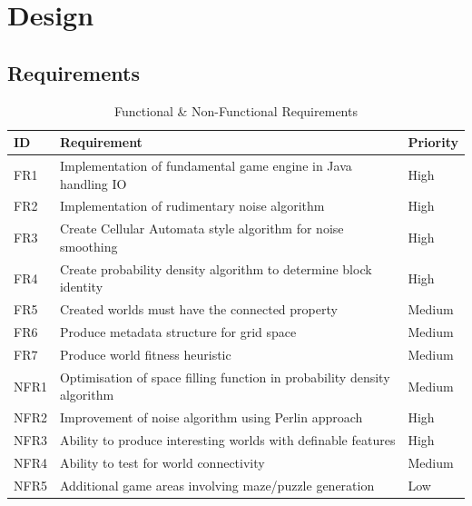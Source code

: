 \documentclass[12pt,a4paper]{article}
\begin{document}
\section{Design}

\subsection{Requirements}

\begin{table}[h!]
\centering
\begin{tabular}{l|l|l}
\textbf{ID}  & \textbf{Requirement}                                           & \textbf{Priority} \\ \hline
FR1 & Implementation of fundamental game engine in Java handling IO    & High     \\
FR2 & Implementation of rudimentary noise algorithm                         & High     \\
FR3 & Create Cellular Automata style algorithm for noise smoothing     & High     \\
FR4 & Create probability density algorithm to determine block identity & High     \\
FR5 & Created worlds must have the connected property    			   & Medium    \\
FR6 & Produce metadata structure for grid space                        & Medium   \\
FR7 & Produce world fitness heuristic                                  & Medium  \\ \hline

NFR1 & Optimisation of space filling function in probability density algorithm    & Medium    \\
NFR2 & Improvement of noise algorithm using Perlin approach & High \\
NFR3 & Ability to produce interesting worlds with definable features & High \\
NFR4 & Ability to test for world connectivity            & Medium     \\
NFR5 & Additional game areas involving maze/puzzle generation & Low \\  

\end{tabular}
\caption{Functional \& Non-Functional Requirements}

\label{table:1}
\end{table}
\end{document}
